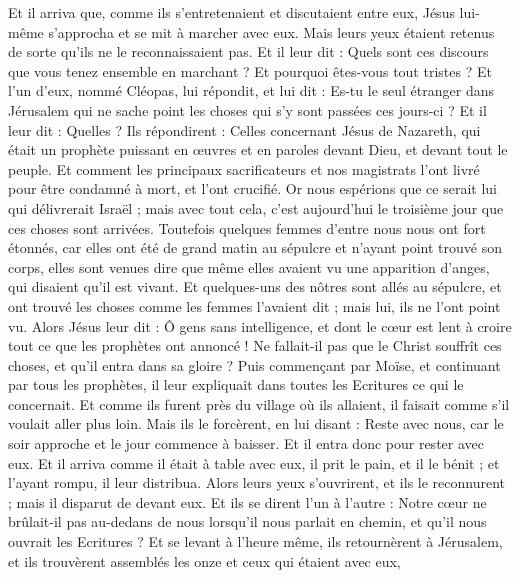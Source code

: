\begin{multicols}{2}
Et il arriva que, comme ils s'entretenaient et discutaient entre eux, Jésus lui-même s'approcha et se mit à marcher avec eux.
Mais leurs yeux étaient retenus de sorte qu'ils ne le reconnaissaient pas.
Et il leur dit : Quels sont ces discours que vous tenez ensemble en marchant ? Et pourquoi êtes-vous tout tristes ?
Et l'un d'eux, nommé Cléopas, lui répondit, et lui dit : Es-tu le seul étranger dans Jérusalem qui ne sache point les choses qui s’y sont passées ces jours-ci ?
Et il leur dit : Quelles ? Ils répondirent : Celles concernant Jésus de Nazareth, qui était un prophète puissant en œuvres et en paroles devant Dieu, et devant tout le peuple.
Et comment les principaux sacrificateurs et nos magistrats l'ont livré pour être condamné à mort, et l'ont crucifié.
Or nous espérions que ce serait lui qui délivrerait Israël ; mais avec tout cela, c'est aujourd'hui le troisième jour que ces choses sont arrivées.
Toutefois quelques femmes d'entre nous nous ont fort étonnés, car elles ont été de grand matin au sépulcre
et n'ayant point trouvé son corps, elles sont venues dire que même elles avaient vu une apparition d'anges, qui disaient qu'il est vivant.
Et quelques-uns des nôtres sont allés au sépulcre, et ont trouvé les choses comme les femmes l’avaient dit ; mais lui, ils ne l'ont point vu.
Alors Jésus leur dit : Ô gens sans intelligence, et dont le cœur est lent à croire tout ce que les prophètes ont annoncé !
Ne fallait-il pas que le Christ souffrît ces choses, et qu'il entra dans sa gloire ?
Puis commençant par Moïse, et continuant par tous les prophètes, il leur expliquait dans toutes les Ecritures ce qui le concernait.
Et comme ils furent près du village où ils allaient, il faisait comme s'il voulait aller plus loin.
Mais ils le forcèrent, en lui disant : Reste avec nous, car le soir approche et le jour commence à baisser. Et il entra donc pour rester avec eux.
Et il arriva comme il était à table avec eux, il prit le pain, et il le bénit ; et l'ayant rompu, il leur distribua.
Alors leurs yeux s’ouvrirent, et ils le reconnurent ; mais il disparut de devant eux.
Et ils se dirent l’un à l’autre : Notre cœur ne brûlait-il pas au-dedans de nous lorsqu'il nous parlait en chemin, et qu'il nous ouvrait\FTNTT{} les Ecritures ?
Et se levant à l’heure même, ils retournèrent à Jérusalem, et ils trouvèrent assemblés les onze et ceux qui étaient avec eux,

\end{multicols}
